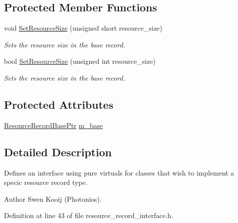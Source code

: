 \subsection*{Protected Member Functions}
\begin{DoxyCompactItemize}
\item 
void \hyperlink{class_senergy_1_1_dns_1_1_resource_record_interface_aaebfbc52b464557ce9a3f36fbc08acd3}{Set\-Resource\-Size} (unsigned short resource\-\_\-size)
\begin{DoxyCompactList}\small\item\em Sets the resource size in the base record. \end{DoxyCompactList}\item 
bool \hyperlink{class_senergy_1_1_dns_1_1_resource_record_interface_a54207eceee2ae035ae5293209b3e721c}{Set\-Resource\-Size} (unsigned int resource\-\_\-size)
\begin{DoxyCompactList}\small\item\em Sets the resource size in the base record. \end{DoxyCompactList}\end{DoxyCompactItemize}
\subsection*{Protected Attributes}
\begin{DoxyCompactItemize}
\item 
\hyperlink{namespace_senergy_1_1_dns_a72915c893fbf242018e79d8f92e1646b}{Resource\-Record\-Base\-Ptr} \hyperlink{class_senergy_1_1_dns_1_1_resource_record_interface_ae2ffc1e85320769af1eabe781fcfc412}{m\-\_\-base}
\end{DoxyCompactItemize}


\subsection{Detailed Description}
Defines an interface using pure virtuals for classes that wish to implement a specic resource record type. 

\begin{DoxyAuthor}{Author}
Swen Kooij (Photonios). 
\end{DoxyAuthor}


Definition at line 43 of file resource\-\_\-record\-\_\-interface.\-h.



